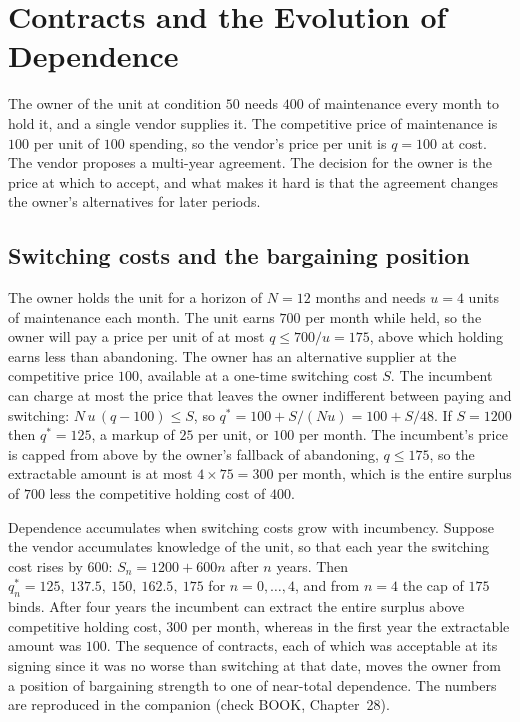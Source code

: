 \chapter{Contracts and the Evolution of Dependence}\label{ch:28}

The owner of the unit at condition $50$ needs $400$ of maintenance every month to hold it, and a single vendor supplies it. The competitive price of maintenance is $100$ per unit of $100$ spending, so the vendor's price per unit is $q=100$ at cost. The vendor proposes a multi-year agreement. The decision for the owner is the price at which to accept, and what makes it hard is that the agreement changes the owner's alternatives for later periods.

\section{Switching costs and the bargaining position}

The owner holds the unit for a horizon of $N=12$ months and needs $u=4$ units of maintenance each month. The unit earns $700$ per month while held, so the owner will pay a price per unit of at most $q\le 700/u=175$, above which holding earns less than abandoning. The owner has an alternative supplier at the competitive price $100$, available at a one-time switching cost $S$. The incumbent can charge at most the price that leaves the owner indifferent between paying and switching: $N\,u\,(q-100)\le S$, so $q^*=100+S/(Nu)=100+S/48$. If $S=1200$ then $q^*=125$, a markup of $25$ per unit, or $100$ per month. The incumbent's price is capped from above by the owner's fallback of abandoning, $q\le 175$, so the extractable amount is at most $4\times 75=300$ per month, which is the entire surplus of $700$ less the competitive holding cost of $400$.

Dependence accumulates when switching costs grow with incumbency. Suppose the vendor accumulates knowledge of the unit, so that each year the switching cost rises by $600$: $S_n=1200+600n$ after $n$ years. Then $q^*_n=125,\ 137.5,\ 150,\ 162.5,\ 175$ for $n=0,\dots,4$, and from $n=4$ the cap of $175$ binds. After four years the incumbent can extract the entire surplus above competitive holding cost, $300$ per month, whereas in the first year the extractable amount was $100$. The sequence of contracts, each of which was acceptable at its signing since it was no worse than switching at that date, moves the owner from a position of bargaining strength to one of near-total dependence. The numbers are reproduced in the companion (check BOOK, Chapter~28).

